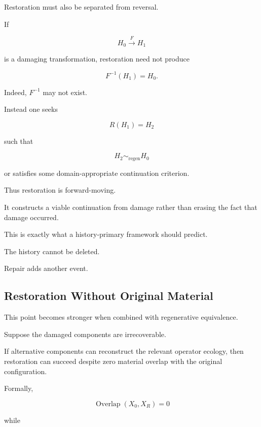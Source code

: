\documentclass[11pt]{article}
\theoremstyle{remark}
\begin{document}
Restoration must also be separated from reversal.

If

\begin{equation}
H_0
\xrightarrow{F}
H_1
\end{equation}

is a damaging transformation, restoration need not produce

\begin{equation}
F^{-1}(H_1)=H_0.
\end{equation}

Indeed, $F^{-1}$ may not exist.

Instead one seeks

\begin{equation}
R(H_1)=H_2
\end{equation}

such that

\begin{equation}
H_2\sim_{\mathrm{regen}}H_0
\end{equation}

or satisfies some domain-appropriate continuation criterion.

Thus restoration is forward-moving.

It constructs a viable continuation from damage rather than erasing the fact that damage occurred.

This is exactly what a history-primary framework should predict.

The history cannot be deleted.

Repair adds another event.

\subsection{Restoration Without Original Material}

This point becomes stronger when combined with regenerative equivalence.

Suppose the damaged components are irrecoverable.

If alternative components can reconstruct the relevant operator ecology, then restoration can succeed despite zero material overlap with the original configuration.

Formally,

\begin{equation}
\operatorname{Overlap}(X_0,X_R)=0
\end{equation}

while
\end{document}
